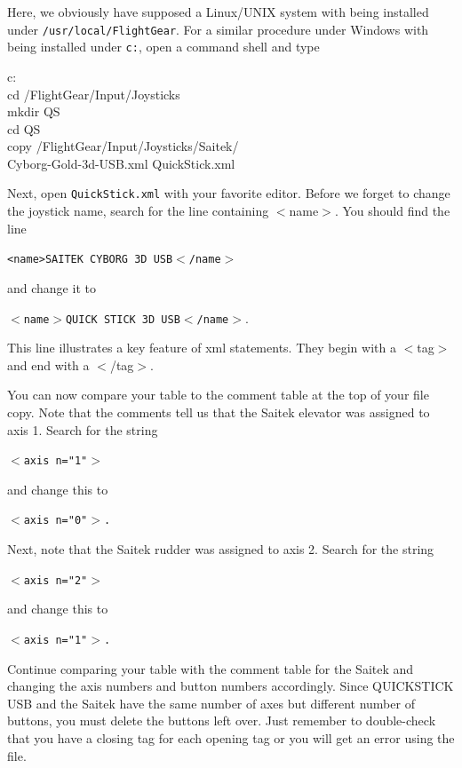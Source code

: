 \noindent
Here, we obviously have supposed a Linux/UNIX system with \FlightGear{} being installed under \texttt{/usr/local/FlightGear}. For a similar procedure under Windows with \FlightGear{} being installed under \texttt{c:\FlightGear}, open a command shell and type
\medskip

\begin{ttfamily}
\noindent
c:\\
cd /FlightGear/Input/Joysticks\\
mkdir QS\\
cd QS\\
copy  /FlightGear/Input/Joysticks/Saitek/\\
Cyborg-Gold-3d-USB.xml  QuickStick.xml
\end{ttfamily}
\medskip

\noindent
Next, open \texttt{QuickStick.xml} with your favorite editor.  Before we forget to change the joystick name, search for the line containing $<$name$>$.  You should find the line
\medskip

\texttt{<name>SAITEK CYBORG 3D USB$<$/name$>$}
\medskip

\noindent
and change it to
\medskip

	\texttt{$<$name$>$QUICK STICK 3D USB$<$/name$>$}.
	\medskip

\noindent
This line illustrates a key feature of xml statements.  They begin with a $<$tag$>$ and end with a $<$/tag$>$.

You can now compare your table to the comment table at the top of your file copy.  Note that the comments tell us that the Saitek elevator was assigned to axis 1.  Search for the string
\medskip

	\texttt{$<$axis n="1"$>$}
\medskip

\noindent
and change this to
\medskip

	\texttt{$<$axis n="0"$>$.}
\medskip

Next, note that the Saitek rudder was assigned to axis 2.  Search for the string
\medskip

	\texttt{$<$axis n="2"$>$}

\noindent
and change this to
\medskip

	\texttt{$<$axis n="1"$>$.}
\medskip

\noindent
Continue comparing your table with the comment table for the Saitek and changing the axis numbers and button numbers accordingly.  Since QUICKSTICK USB and the Saitek have the same number of axes but different number of buttons, you must delete the buttons left over.  Just remember to double-check that you have a closing tag for each opening tag or you will get an error using the file.

